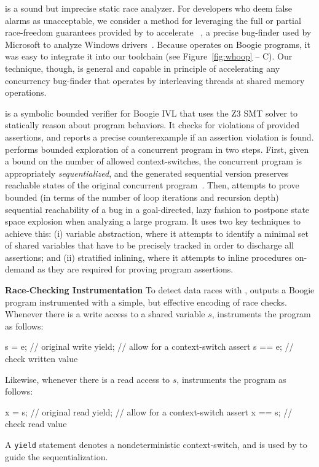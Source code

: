 \whoop is a sound but imprecise static race analyzer. For developers who deem false alarms as unacceptable, we consider a method for leveraging the full or partial race-freedom guarantees provided by \whoop to accelerate \corral~\cite{lal2012corral}, a precise bug-finder used by Microsoft to analyze Windows drivers~\cite{lal2014powering}.  Because \corral operates on Boogie programs, it was easy to integrate it into our toolchain (see Figure~\ref{fig:whoop} -- C). Our technique, though, is general and capable in principle of accelerating any concurrency bug-finder that operates by interleaving threads at shared memory operations.

\corral is a symbolic bounded verifier for Boogie IVL that uses the Z3 SMT solver to statically reason about program behaviors. It checks for violations of provided assertions, and reports a precise counterexample if an assertion violation is found. \corral performs bounded exploration of a concurrent program in two steps. First, given a bound on the number of allowed context-switches, the concurrent program is appropriately \emph{sequentialized}, and the generated sequential version preserves reachable states of the original concurrent program~\cite{popl2011-eqr,cav2009-lqr,cavLalR08}. Then, \corral attempts to prove bounded (in terms of the number of loop iterations and recursion depth) sequential reachability of a bug in a goal-directed, lazy fashion to postpone state space explosion when analyzing a large program. It uses two key techniques to achieve this: (i) variable abstraction, where it attempts to identify a minimal set of shared variables that have to be precisely tracked in order to discharge all assertions; and (ii) stratified inlining, where it attempts to inline procedures on-demand as they are required for proving program assertions.

\noindent\textbf{Race-Checking Instrumentation }
%
To detect data races with \corral, \whoop outputs a Boogie program instrumented with a simple, but effective encoding of race checks. Whenever there is a write access to a shared variable $s$, \whoop instruments the program as follows:
%
\begin{boogie}
s = e;         // original write
yield;         // allow for a context-switch
assert s == e; // check written value
\end{boogie}%
%
Likewise, whenever there is a read access to $s$, \whoop instruments the program as follows:
%
\begin{boogie}
x = s;         // original read
yield;         // allow for a context-switch
assert x == s; // check read value
\end{boogie}%
%
A \texttt{yield} statement denotes a nondeterministic context-switch, and is used by \corral to guide the sequentialization.

